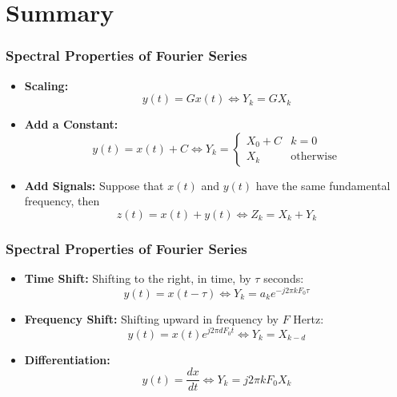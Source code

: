 \documentclass{beamer}
\begin{document}
\section[Summary]{Summary}
\setcounter{subsection}{1}

\begin{frame}
  \frametitle{Spectral Properties of Fourier Series}
  \begin{itemize}
  \item {\bf Scaling:}
    \[
    y(t) = Gx(t)\Leftrightarrow Y_k = GX_k
    \]
  \item {\bf Add a Constant:}
    \[
    y(t)=x(t)+C \Leftrightarrow
    Y_k = \begin{cases}
      X_0+C & k=0 \\
      X_k & \mbox{otherwise}
    \end{cases}
    \]
  \item {\bf Add Signals:} Suppose that $x(t)$ and $y(t)$ have the
    same fundamental frequency, then
    \[
    z(t)=x(t)+y(t)
    \Leftrightarrow
    Z_k = X_k+Y_k
    \]
  \end{itemize}
\end{frame}  

\begin{frame}
  \frametitle{Spectral Properties of Fourier Series}
  \begin{itemize}
  \item {\bf Time Shift:} Shifting to the right, in time, by $\tau$
    seconds:
    \[
    y(t)=x(t-\tau)\Leftrightarrow Y_k= a_k e^{-j2\pi kF_0\tau}
    \]
  \item {\bf Frequency Shift:} Shifting upward in frequency by $F$
    Hertz:
    \[
    y(t)=x(t)e^{j2\pi dF_0t} \Leftrightarrow Y_k= X_{k-d}
    \]
  \item {\bf Differentiation:}
    \[
    y(t) = \frac{dx}{dt} \Leftrightarrow Y_k= j2\pi kF_0 X_k
    \]
  \end{itemize}
\end{frame}  
        
\end{document}
